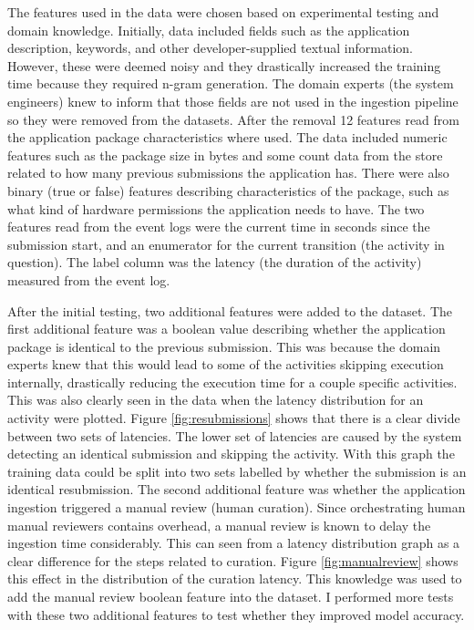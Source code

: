
The features used in the data were chosen based on experimental testing and domain knowledge.
Initially, data included fields such as the application description, keywords, and other developer-supplied textual information. 
However, these were deemed noisy and they drastically increased the training time because they required n-gram generation.
The domain experts (the system engineers) knew to inform that those fields are not used in the ingestion pipeline so they were removed from the datasets.
After the removal 12 features read from the application package characteristics where used. 
The data included numeric features such as the package size in bytes and some count data from the store related to how many previous submissions the application has.
There were also binary (true or false) features describing characteristics of the package, such as what kind of hardware permissions the application needs to have.
The two features read from the event logs were the current time in seconds since the submission start, and an enumerator for the current transition (the activity in question).
The label column was the latency (the duration of the activity) measured from the event log.

After the initial testing, two additional features were added to the dataset.
The first additional feature was a boolean value describing whether the application package is identical to the previous submission.
This was because the domain experts knew that this would lead to some of the activities skipping execution internally, drastically reducing the execution time for a couple specific activities. 
This was also clearly seen in the data when the latency distribution for an activity were plotted. 
Figure \ref{fig:resubmissions} shows that there is a clear divide between two sets of latencies.
The lower set of latencies are caused by the system detecting an identical submission and skipping the activity.
With this graph the training data could be split into two sets labelled by whether the submission is an identical resubmission.
The second additional feature was whether the application ingestion triggered a manual review (human curation). 
Since orchestrating human manual reviewers contains overhead, a manual review is known to delay the ingestion time considerably.
This can seen from a latency distribution graph as a clear difference for the steps related to curation. 
Figure \ref{fig:manualreview} shows this effect in the distribution of the curation latency.
This knowledge was used to add the manual review boolean feature into the dataset.
I performed more tests with these two additional features to test whether they improved model accuracy.

